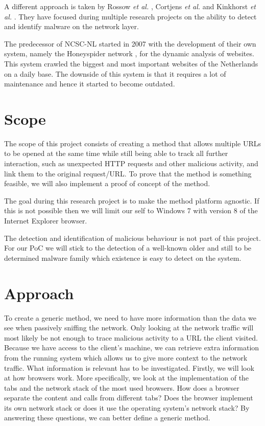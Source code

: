 \documentclass{scrartcl}
\begin{document}
A different approach is taken by Rossow \textit{et al.} \cite{Rossow2011}, Cortjens \textit{et al.} \cite{Cortjens2012} and Kinkhorst \textit{et al.} \cite{Kinkhorst2009}. They have focused during multiple research projects on the ability to detect and identify malware on the network layer.

The predecessor of NCSC-NL started in 2007 with the development of their own system, namely the Honeyspider network \cite{honeyspider}, for the dynamic analysis of websites. This system crawled the biggest and most important websites of the Netherlands on a daily base. The downside of this system is that it requires a lot of maintenance and hence it started to become outdated.

\section{Scope}

The scope of this project consists of creating a method that allows multiple URLs to be opened at the same time while still being able to track all further interaction, such as unexpected HTTP requests and other malicious activity, and link them to the original request/URL. To prove that the method is something feasible, we will also implement a proof of concept of the method.

The goal during this research project is to make the method platform agnostic. If this is not possible then we will limit our self to Windows 7 with version 8 of the Internet Explorer browser.

The detection and identification of malicious behaviour is not part of this project. For our PoC we will stick to the detection of a well-known older and still to be determined malware family which existence is easy to detect on the system. 

\section{Approach}

To create a generic method, we need to have more information than the data we see when passively sniffing the network. Only looking at the network traffic will most likely be not enough to trace malicious activity to a URL the client visited. Because we have access to the client's machine, we can retrieve extra information from the running system which allows us to give more context to the network traffic. What information is relevant has to be investigated. Firstly, we will look at how browsers work. More specifically, we look at the implementation of the tabs and the network stack of the most used browsers. How does a browser separate the content and calls from different tabs? Does the browser implement its own network stack or does it use the operating system's network stack? By answering these questions, we can better define a generic method.
\end{document}
